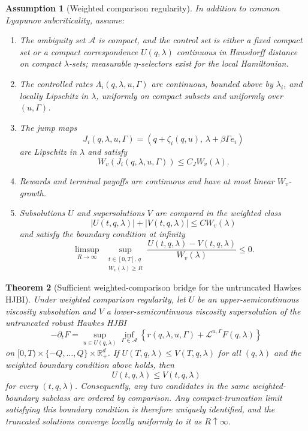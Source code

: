 \documentclass[11pt]{article}
\newtheorem{assumption}{Assumption}
\newtheorem{theorem}[assumption]{Theorem}
\newcommand{\R}{\mathbb{R}}
\begin{document}
\begin{assumption}[Weighted comparison regularity]
In addition to common Lyapunov subcriticality, assume:
\begin{enumerate}
\item The ambiguity set $\mathcal A$ is compact, and the control set is either
a fixed compact set or a compact correspondence $U(q,\lambda)$ continuous in
Hausdorff distance on compact $\lambda$-sets; measurable $\eta$-selectors
exist for the local Hamiltonian.
\item The controlled rates $\Lambda_i(q,\lambda,u,\Gamma)$ are continuous,
bounded above by $\lambda_i$, and locally Lipschitz in $\lambda$, uniformly on
compact subsets and uniformly over $(u,\Gamma)$.
\item The jump maps
\[
J_i(q,\lambda,u,\Gamma)=
(q+\zeta_i(q,u),\,\lambda+\beta\Gamma e_i)
\]
are Lipschitz in $\lambda$ and satisfy
\[
W_v(J_i(q,\lambda,u,\Gamma))\le C_J W_v(\lambda).
\]
\item Rewards and terminal payoffs are continuous and have at most linear
$W_v$-growth.
\item Subsolutions $U$ and supersolutions $V$ are compared in the weighted
class
\[
|U(t,q,\lambda)|+|V(t,q,\lambda)|\le C W_v(\lambda)
\]
and satisfy the boundary condition at infinity
\[
\limsup_{R\to\infty}\;
\sup_{\substack{t\in[0,T],\,q\\ W_v(\lambda)\ge R}}
\frac{U(t,q,\lambda)-V(t,q,\lambda)}{W_v(\lambda)}
\le 0.
\]
\end{enumerate}
\end{assumption}

\begin{theorem}[Sufficient weighted-comparison bridge for the untruncated Hawkes HJBI]
Under weighted comparison regularity, let $U$ be an upper-semicontinuous
viscosity subsolution and $V$ a lower-semicontinuous viscosity supersolution
of the untruncated robust Hawkes HJBI
\[
-\partial_t F=
\sup_{u\in U(q,\lambda)}\inf_{\Gamma\in\mathcal A}
\left\{
r(q,\lambda,u,\Gamma)+\mathcal L^{u,\Gamma}F(q,\lambda)
\right\}
\]
on $[0,T)\times\{-Q,\ldots,Q\}\times\R_+^d$. If
$U(T,q,\lambda)\le V(T,q,\lambda)$ for all $(q,\lambda)$ and the weighted
boundary condition above holds, then
\[
U(t,q,\lambda)\le V(t,q,\lambda)
\]
for every $(t,q,\lambda)$. Consequently, any two candidates in the same
weighted-boundary subclass are ordered by comparison. Any compact-truncation
limit satisfying this boundary condition is therefore uniquely identified, and
the truncated solutions converge locally uniformly to it as $R\uparrow\infty$.
\end{theorem}
\end{document}
